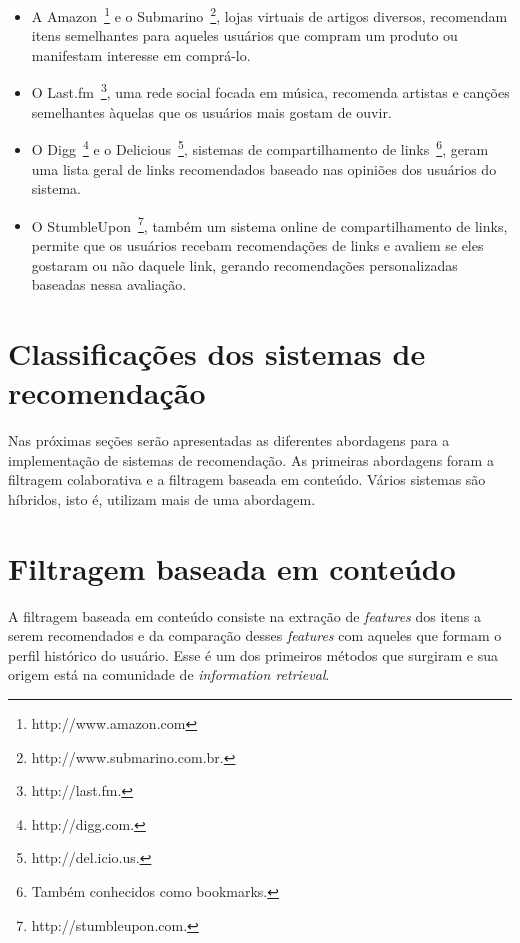 \begin{itemize}
\item 
A Amazon~\footnote{http://www.amazon.com} e o Submarino~\footnote{http://www.submarino.com.br.}, lojas virtuais de artigos diversos, recomendam itens semelhantes para aqueles usuários que compram um produto ou manifestam interesse em comprá-lo.

\item O Last.fm~\footnote{http://last.fm.}, uma rede social focada em música, recomenda artistas e canções semelhantes àquelas que os usuários mais gostam de ouvir.

\item O Digg~\footnote{http://digg.com.} e o Delicious~\footnote{http://del.icio.us.}, sistemas de compartilhamento de links~\footnote{Também conhecidos como bookmarks.}, geram uma lista geral de links recomendados baseado nas opiniões dos usuários do sistema.

\item O StumbleUpon~\footnote{http://stumbleupon.com.}, também um sistema online de compartilhamento de links, permite que os usuários recebam recomendações de links e avaliem se eles gostaram ou não daquele link, gerando recomendações personalizadas baseadas nessa avaliação.
\end{itemize}


\section{Classificações dos sistemas de recomendação}

Nas próximas seções serão apresentadas as diferentes abordagens para a implementação de sistemas de recomendação. As primeiras abordagens foram a filtragem colaborativa e a filtragem baseada em conteúdo. Vários sistemas são híbridos, isto é, utilizam mais de uma abordagem.


\section{Filtragem baseada em conteúdo} %
A filtragem baseada em conteúdo consiste na extração de \textit{features} dos itens a serem recomendados e da comparação desses \textit{features} com aqueles que formam o  perfil histórico do usuário. Esse é um dos primeiros métodos que surgiram e sua origem está na comunidade de \textit{information retrieval}.~\cite{Balabanovi97}

